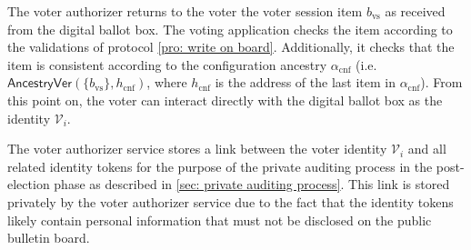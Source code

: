 The voter authorizer returns to the voter the voter session item $b_\mathrm{vs}$ as received from the digital ballot box. The voting application checks the item according to the validations of protocol \ref{pro: write on board}. Additionally, it checks that the item is consistent according to the configuration ancestry $\alpha_\mathrm{cnf}$ (i.e. $\mathsf{AncestryVer}(\{ b_\mathrm{vs} \}, h_\mathrm{cnf})$, where $h_\mathrm{cnf}$ is the address of the last item in $\alpha_\mathrm{cnf}$). From this point on, the voter can interact directly with the digital ballot box as the identity $\mathcal{V}_i$.

The voter authorizer service stores a link between the voter identity $\mathcal{V}_i$ and all related identity tokens for the purpose of the private auditing process in the post-election phase as described in \cref{sec: private auditing process}. This link is stored privately by the voter authorizer service due to the fact that the identity tokens likely contain personal information that must not be disclosed on the public bulletin board.

